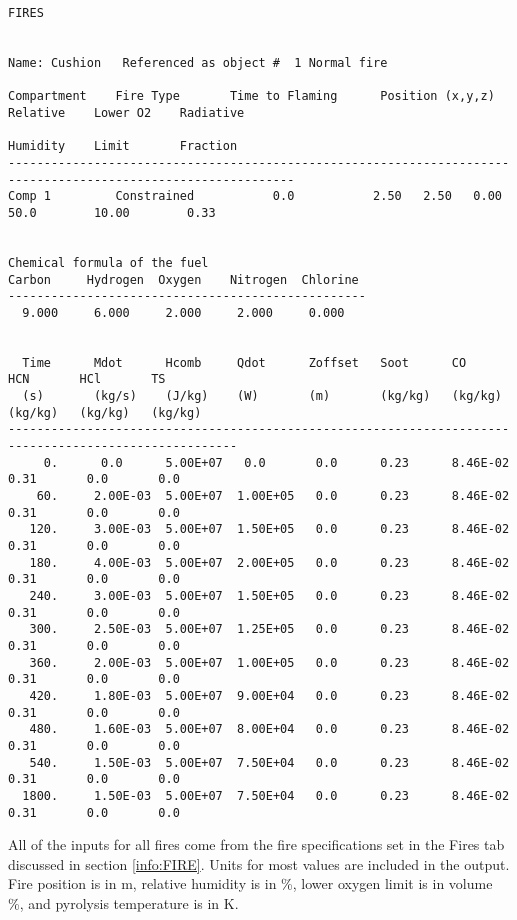 \begin{lstlisting}[basicstyle=\tiny]
FIRES


Name: Cushion   Referenced as object #  1 Normal fire

Compartment    Fire Type       Time to Flaming      Position (x,y,z)     Relative    Lower O2    Radiative
                                                                         Humidity    Limit       Fraction
--------------------------------------------------------------------------------------------------------------
Comp 1         Constrained           0.0           2.50   2.50   0.00     50.0        10.00        0.33


Chemical formula of the fuel
Carbon     Hydrogen  Oxygen    Nitrogen  Chlorine
--------------------------------------------------
  9.000     6.000     2.000     2.000     0.000


  Time      Mdot      Hcomb     Qdot      Zoffset   Soot      CO        HCN       HCl       TS
  (s)       (kg/s)    (J/kg)    (W)       (m)       (kg/kg)   (kg/kg)   (kg/kg)   (kg/kg)   (kg/kg)
------------------------------------------------------------------------------------------------------
     0.      0.0      5.00E+07   0.0       0.0      0.23      8.46E-02  0.31       0.0       0.0
    60.     2.00E-03  5.00E+07  1.00E+05   0.0      0.23      8.46E-02  0.31       0.0       0.0
   120.     3.00E-03  5.00E+07  1.50E+05   0.0      0.23      8.46E-02  0.31       0.0       0.0
   180.     4.00E-03  5.00E+07  2.00E+05   0.0      0.23      8.46E-02  0.31       0.0       0.0
   240.     3.00E-03  5.00E+07  1.50E+05   0.0      0.23      8.46E-02  0.31       0.0       0.0
   300.     2.50E-03  5.00E+07  1.25E+05   0.0      0.23      8.46E-02  0.31       0.0       0.0
   360.     2.00E-03  5.00E+07  1.00E+05   0.0      0.23      8.46E-02  0.31       0.0       0.0
   420.     1.80E-03  5.00E+07  9.00E+04   0.0      0.23      8.46E-02  0.31       0.0       0.0
   480.     1.60E-03  5.00E+07  8.00E+04   0.0      0.23      8.46E-02  0.31       0.0       0.0
   540.     1.50E-03  5.00E+07  7.50E+04   0.0      0.23      8.46E-02  0.31       0.0       0.0
  1800.     1.50E-03  5.00E+07  7.50E+04   0.0      0.23      8.46E-02  0.31       0.0       0.0
\end{lstlisting}
All of the inputs for all fires come from the fire specifications set in the Fires tab discussed in section \ref{info:FIRE}.  Units for most values are included in the output.  Fire position is in m, relative humidity is in \%, lower oxygen limit is in volume \%, and pyrolysis temperature is in K.


